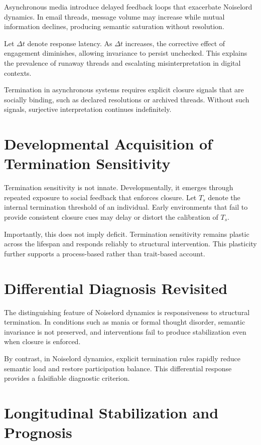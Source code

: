 \documentclass[12pt]{article}
\theoremstyle{remark}
\begin{document}
Asynchronous media introduce delayed feedback loops that exacerbate Noiselord dynamics. In email threads, message volume may increase while mutual information declines, producing semantic saturation without resolution.

Let $\Delta t$ denote response latency. As $\Delta t$ increases, the corrective effect of engagement diminishes, allowing invariance to persist unchecked. This explains the prevalence of runaway threads and escalating misinterpretation in digital contexts.

Termination in asynchronous systems requires explicit closure signals that are socially binding, such as declared resolutions or archived threads. Without such signals, surjective interpretation continues indefinitely.

\section{Developmental Acquisition of Termination Sensitivity}

Termination sensitivity is not innate. Developmentally, it emerges through repeated exposure to social feedback that enforces closure. Let $T_s$ denote the internal termination threshold of an individual. Early environments that fail to provide consistent closure cues may delay or distort the calibration of $T_s$.

Importantly, this does not imply deficit. Termination sensitivity remains plastic across the lifespan and responds reliably to structural intervention. This plasticity further supports a process-based rather than trait-based account.

\section{Differential Diagnosis Revisited}

The distinguishing feature of Noiselord dynamics is responsiveness to structural termination. In conditions such as mania or formal thought disorder, semantic invariance is not preserved, and interventions fail to produce stabilization even when closure is enforced.

By contrast, in Noiselord dynamics, explicit termination rules rapidly reduce semantic load and restore participation balance. This differential response provides a falsifiable diagnostic criterion.

\section{Longitudinal Stabilization and Prognosis}
\end{document}
